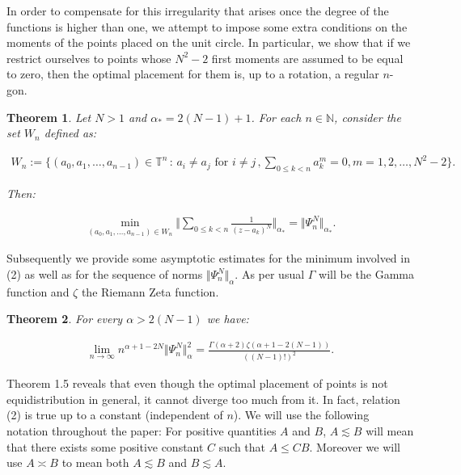 \documentclass{amsart}[11pt]
\newcommand{\N}{\mathbb{N}} %
\newcommand{\T}{\mathbb{T}} %
\newcommand{\no}[1]{\Vert #1 \Vert} %
\newcommand{\ra}{\rightarrow}
\newtheorem{theorem}{Theorem}[section]
\theoremstyle{definition}
\begin{document}
In order to compensate for this irregularity that arises once the degree of the functions is higher than one, we attempt to impose some extra conditions on the moments of the points placed on the unit circle. In particular, we show that if we restrict ourselves to points whose $N^2-2$ first moments are assumed to be equal to zero, then the optimal placement for them is, up to a rotation, a regular $n$-gon. 

\begin{theorem}
    Let $N > 1$ and $\alpha_{\ast} = 2(N-1) + 1$. For each $n\in \N$, consider the set $W_n$ defined as:

    \begin{gather*}
        W_n := \bigg\{ (a_0, a_1, \ldots, a_{n-1}) \in \T^n \, : \, a_i \neq a_j \,\, \text{for} \,\,i \neq j\, , \sum_{0 \leq k < n} a_k^m =0 , m = 1,2,\ldots , N^2-2 \bigg\}.
    \end{gather*}

Then:

\begin{gather*}
\min_{(a_0, a_1, \ldots, a_{n-1}) \in W_n} \bigg \Vert \sum_{0 \leq k < n} \frac{1}{(z-a_k)^N} \bigg \Vert_{\alpha_{\ast}} = \no{\Psi_n^N}_{\alpha_{\ast}}.
\end{gather*}
    
\end{theorem}

Subsequently we provide some asymptotic estimates for the minimum involved in (2) as well as for the sequence of norms $\no{\Psi_n^N}_{\alpha}$. As per usual $\Gamma$ will be the Gamma function and $\zeta$ the Riemann Zeta function.

\begin{theorem}
    For every $\alpha > 2(N-1)$ we have:

    \begin{gather*}
    \lim_{n \ra \infty} n^{\alpha + 1- 2N  }  \Vert \Psi_n^N \Vert_{\alpha}^2 = \frac{\Gamma(\alpha +2) \zeta(\alpha + 1 - 2(N-1))}{((N-1)!)^2}.
    \end{gather*}
    
\end{theorem}

Theorem 1.5 reveals that even though the optimal placement of points is not equidistribution in general, it cannot diverge too much from it. In fact, relation (2) is true up to a constant (independent of $n$). We will use the following notation throughout the paper: For positive quantities $A$ and $B$, $A \lesssim B$ will mean that  there exists some positive constant $C$ such that $A \leq C B $. Moreover we will use $A \asymp B$ to mean both $A \lesssim B $ and $B \lesssim A$.
\end{document}
